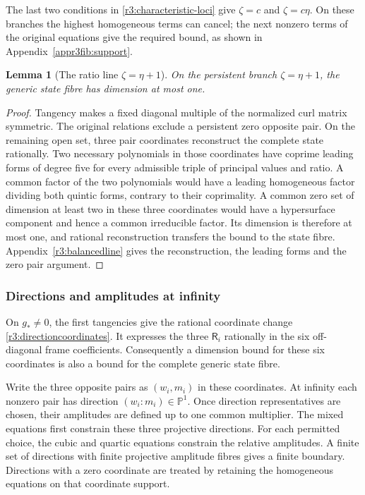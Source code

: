 \documentclass[11pt,a4paper]{article}
\numberwithin{equation}{section}
\theoremstyle{plain}
\newtheorem{lemma}[theorem]{Lemma}
\theoremstyle{definition}
\theoremstyle{remark}
\begin{document}
The last two conditions in
\eqref{r3:characteristic-loci} give $\zeta=c$ and $\zeta=c\eta$.
On these branches the highest homogeneous terms can cancel; the
next nonzero terms of the original equations give the required
bound, as shown in Appendix~\ref{appr3fib:support}.

\begin{lemma}[The ratio line $\zeta=\eta+1$]\label{r3:balancedbound}
On the persistent branch $\zeta=\eta+1$, the generic state fibre
has dimension at most one.
\end{lemma}
\begin{proof}
Tangency makes a fixed diagonal multiple of the normalized curl
matrix symmetric. The original relations exclude a persistent
zero opposite pair. On the remaining open set, three pair
coordinates reconstruct the complete state rationally. Two
necessary polynomials in those coordinates have coprime leading
forms of degree five for every admissible triple of principal
values and ratio. A common factor of the two polynomials would have a leading
homogeneous factor dividing both quintic forms, contrary to
their coprimality. A common zero set of dimension at least two
in these three coordinates would have a hypersurface component
and hence a common irreducible factor. Its dimension is therefore
at most one, and rational reconstruction transfers the bound to
the state fibre. Appendix~\ref{r3:balancedline} gives the
reconstruction, the leading forms and the zero pair argument.
\end{proof}

\subsubsection{Directions and amplitudes at infinity}

On $g_*\ne0$, the first tangencies give the rational coordinate change
\eqref{r3:directioncoordinates}. It expresses the three
$\mathsf R_i$ rationally in the six off-diagonal frame
coefficients. Consequently a dimension bound for these six
coordinates is also a bound for the complete generic state fibre.

Write the three opposite pairs as $(w_i,m_i)$ in these coordinates.
At infinity each nonzero pair has direction
$(w_i:m_i)\in\mathbb P^1$. Once direction representatives are
chosen, their amplitudes are defined up to one common multiplier.
The mixed equations first constrain these three projective
directions. For each permitted choice, the cubic and quartic
equations constrain the relative amplitudes. A finite set of
directions with finite projective amplitude fibres gives a finite
boundary. Directions with a zero coordinate are treated by retaining
the homogeneous equations on that coordinate support.
\end{document}
